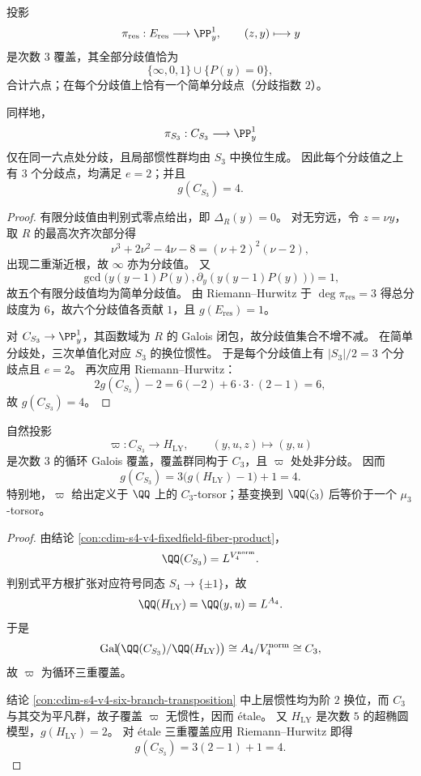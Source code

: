 \begin{conclusion}[六点同型分歧定律与换位惯性]\label{con:cdim-s4-v4-six-branch-transposition}
投影
\[
\pi_{\mathrm{res}}:E_{\mathrm{res}}\longrightarrow \PP^1_y,\qquad (z,y)\longmapsto y
\]
是次数 \(3\) 覆盖，其全部分歧值恰为
\[
\{\infty,0,1\}\cup\{P(y)=0\},
\]
合计六点；在每个分歧值上恰有一个简单分歧点（分歧指数 \(2\)）。

同样地，
\[
\pi_{S_3}:C_{S_3}\longrightarrow \PP^1_y
\]
仅在同一六点处分歧，且局部惯性群均由 \(S_3\) 中换位生成。
因此每个分歧值之上有 \(3\) 个分歧点，均满足 \(e=2\)；并且
\[
g(C_{S_3})=4.
\]
\end{conclusion}
\begin{proof}
有限分歧值由判别式零点给出，即 \(\Delta_R(y)=0\)。
对无穷远，令 \(z=\nu y\)，取 \(R\) 的最高次齐次部分得
\[
\nu^{3}+2\nu^{2}-4\nu-8=(\nu+2)^{2}(\nu-2),
\]
出现二重渐近根，故 \(\infty\) 亦为分歧值。
又
\[
\gcd\!\bigl(y(y-1)P(y),\partial_y(y(y-1)P(y))\bigr)=1,
\]
故五个有限分歧值均为简单分歧值。
由 Riemann--Hurwitz 于 \(\deg \pi_{\mathrm{res}}=3\) 得总分歧度为 \(6\)，故六个分歧值各贡献 \(1\)，且 \(g(E_{\mathrm{res}})=1\)。

对 \(C_{S_3}\to\PP^1_y\)，其函数域为 \(R\) 的 Galois 闭包，故分歧值集合不增不减。
在简单分歧处，三次单值化对应 \(S_3\) 的换位惯性。
于是每个分歧值上有 \(|S_3|/2=3\) 个分歧点且 \(e=2\)。
再次应用 Riemann--Hurwitz：
\[
2g(C_{S_3})-2=6(-2)+6\cdot 3\cdot(2-1)=6,
\]
故 \(g(C_{S_3})=4\)。
\end{proof}

\begin{conclusion}\label{con:cdim-s4-v4-etale-c3-torsor}
自然投影
\[
\varpi:C_{S_3}\longrightarrow H_{\mathrm{LY}},\qquad (y,u,z)\longmapsto(y,u)
\]
是次数 \(3\) 的循环 Galois 覆盖，覆盖群同构于 \(C_3\)，且 \(\varpi\) 处处非分歧。
因而
\[
g(C_{S_3})=3\bigl(g(H_{\mathrm{LY}})-1\bigr)+1=4.
\]
特别地，\(\varpi\) 给出定义于 \(\QQ\) 上的 \(C_3\)-torsor；基变换到 \(\QQ(\zeta_3)\) 后等价于一个 \(\mu_3\)-torsor。
\end{conclusion}
\begin{proof}
由结论 \ref{con:cdim-s4-v4-fixedfield-fiber-product}，
\[
\QQ(C_{S_3})=L^{V_{4}^{\mathrm{norm}}}.
\]
判别式平方根扩张对应符号同态 \(S_4\to\{\pm1\}\)，故
\[
\QQ(H_{\mathrm{LY}})=\QQ(y,u)=L^{A_4}.
\]
于是
\[
\mathrm{Gal}\!\bigl(\QQ(C_{S_3})/\QQ(H_{\mathrm{LY}})\bigr)\cong A_4/V_4^{\mathrm{norm}}\cong C_3,
\]
故 \(\varpi\) 为循环三重覆盖。

结论 \ref{con:cdim-s4-v4-six-branch-transposition} 中上层惯性均为阶 \(2\) 换位，而 \(C_3\) 与其交为平凡群，故子覆盖 \(\varpi\) 无惯性，因而 étale。
又 \(H_{\mathrm{LY}}\) 是次数 \(5\) 的超椭圆模型，\(g(H_{\mathrm{LY}})=2\)。
对 étale 三重覆盖应用 Riemann--Hurwitz 即得
\[
g(C_{S_3})=3(2-1)+1=4.
\]
\end{proof}

